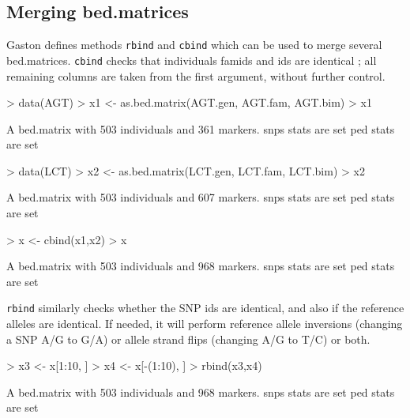 \documentclass{article}
\renewenvironment{Schunk}{\vspace{\topsep}}{\vspace{\topsep}}
\begin{document}
\subsection{Merging bed.matrices}

  Gaston defines methods \verb!rbind! and \verb!cbind! which can be used to merge several
  bed.matrices. \verb!cbind! checks that individuals famids and ids are identical ; all remaining
  columns are taken from the first argument, without further control.

\begin{Schunk}
\begin{Sinput}
> data(AGT)
> x1 <- as.bed.matrix(AGT.gen, AGT.fam, AGT.bim)
> x1
\end{Sinput}
\begin{Soutput}
A bed.matrix with 503 individuals and 361 markers.
snps stats are set
ped stats are set
\end{Soutput}
\begin{Sinput}
> data(LCT)
> x2 <- as.bed.matrix(LCT.gen, LCT.fam, LCT.bim)
> x2
\end{Sinput}
\begin{Soutput}
A bed.matrix with 503 individuals and 607 markers.
snps stats are set
ped stats are set
\end{Soutput}
\begin{Sinput}
> x <- cbind(x1,x2)
> x
\end{Sinput}
\begin{Soutput}
A bed.matrix with 503 individuals and 968 markers.
snps stats are set
ped stats are set
\end{Soutput}
\end{Schunk}

  \verb!rbind! similarly checks whether the SNP ids are identical, and also if the reference
  alleles are identical. If needed, it will perform reference allele inversions (changing a SNP
  A/G to G/A) or allele strand flips (changing A/G to T/C) or both.

\begin{Schunk}
\begin{Sinput}
> x3 <- x[1:10, ]
> x4 <- x[-(1:10), ]
> rbind(x3,x4)
\end{Sinput}
\begin{Soutput}
A bed.matrix with 503 individuals and 968 markers.
snps stats are set
ped stats are set
\end{Soutput}
\end{Schunk}


\end{document}
